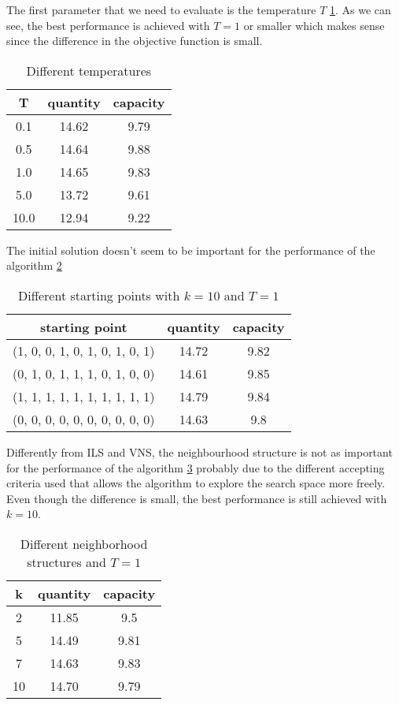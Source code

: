 The first parameter that we need to evaluate is the temperature $T$ \ref{tab:sa-temp}. As we can see, the best performance is achieved with $T=1$ or smaller which makes sense since the difference in the objective function is small.
\begin{table}[H]
    \centering
    \begin{tabular}{c||c |c}
        T    & quantity & capacity \\ \hline
        0.1  & 14.62    & 9.79     \\
        0.5  & 14.64    & 9.88     \\
        1.0  & 14.65    & 9.83     \\
        5.0  & 13.72    & 9.61     \\
        10.0 & 12.94    & 9.22     \\
    \end{tabular}
    \caption{Different temperatures}
    \label{tab:sa-temp}
\end{table}

The initial solution doesn't seem to be important for the performance of the algorithm \ref{tab:sa-start}
\begin{table}[H]
    \centering
    \begin{tabular}{c||c |c}
        starting point                 & quantity & capacity \\ \hline
        (1, 0, 0, 1, 0, 1, 0, 1, 0, 1) & 14.72    & 9.82     \\
        (0, 1, 0, 1, 1, 1, 0, 1, 0, 0) & 14.61    & 9.85     \\
        (1, 1, 1, 1, 1, 1, 1, 1, 1, 1) & 14.79    & 9.84     \\
        (0, 0, 0, 0, 0, 0, 0, 0, 0, 0) & 14.63    & 9.8      \\
    \end{tabular}
    \caption{Different starting points with $k=10$ and $T=1$}
    \label{tab:sa-start}
\end{table}

Differently from ILS and VNS, the neighbourhood structure is not as important for the performance of the algorithm \ref{tab:sa-neigh} probably due to the different accepting criteria used that allows the algorithm to explore the search space more freely. Even though the difference is small, the best performance is still achieved with $k=10$.
\begin{table}[H]
    \centering
    \begin{tabular}{c||c |c}
        k  & quantity & capacity \\ \hline
        2  & 11.85    & 9.5      \\
        5  & 14.49    & 9.81     \\
        7  & 14.63    & 9.83     \\
        10 & 14.70     & 9.79     \\
    \end{tabular}
    \caption{Different neighborhood structures and $T=1$}
    \label{tab:sa-neigh}
\end{table}

